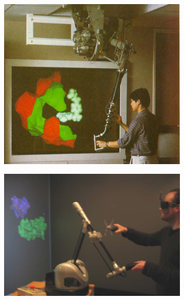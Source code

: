 \begin{figure}[h]
  \begin{subfigure}{.33\textwidth}
  \centering
  {\includegraphics[width=0.9\linewidth]{./figures/ch2/taylor_haptic}}
    \caption{}
    \label{Fig:taylor_haptic}
  \end{subfigure}
  \begin{subfigure}{.33\textwidth}
  \centering
  {\includegraphics[width=0.9\linewidth]{./figures/ch2/haptic_docking}}
    \caption{}
    \label{Fig:haptic_docking}
  \end{subfigure}
  \begin{subfigure}{.33\textwidth}
  \centering

\end{subfigure}
\end{figure}

